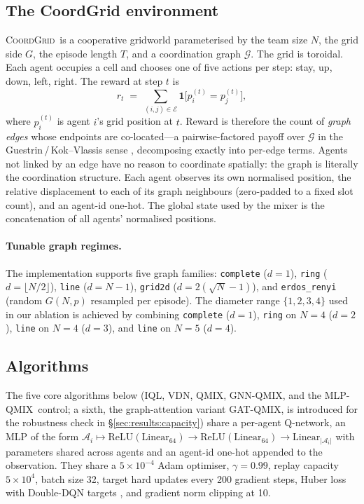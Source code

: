 \documentclass[10pt]{article}
\newcommand{\algoname}[1]{\textsc{#1}}
\newcommand{\iql}{\algoname{IQL}}
\newcommand{\vdn}{\algoname{VDN}}
\newcommand{\qmix}{\algoname{QMIX}}
\newcommand{\gnnqmix}{\algoname{GNN-QMIX}}
\newcommand{\coordgrid}{\textsc{CoordGrid}}
\newcommand{\Aagent}{\mathcal{A}}
\newcommand{\Egraph}{\mathcal{E}}
\newcommand{\Gtask}{\mathcal{G}}
\newcommand{\mlpqmix}{\algoname{MLP-QMIX}}
\newcommand{\gatqmix}{\algoname{GAT-QMIX}}
\begin{document}
\subsection{The CoordGrid environment}
\label{sec:env}

\coordgrid\ is a cooperative gridworld parameterised by the team size $N$,
the grid side $G$, the episode length $T$, and a coordination graph
$\Gtask$. The grid is toroidal. Each agent occupies a cell and chooses one
of five actions per step: stay, up, down, left, right. The reward at step
$t$ is
\[
  r_t \;=\; \sum_{(i,j) \in \Egraph} \mathbf{1}\bigl[p_i^{(t)} = p_j^{(t)}\bigr],
\]
where $p_i^{(t)}$ is agent $i$'s grid position at $t$. Reward is therefore
the count of \emph{graph edges} whose endpoints are co-located---a
pairwise-factored payoff over $\Gtask$ in the Guestrin\,/\,Kok--Vlassis sense
\citep{guestrin_2002_coordrl,kok_2004_sparseq}, decomposing exactly into
per-edge terms. Agents not
linked by an edge have no reason to coordinate spatially: the graph is
literally the coordination structure. Each agent observes its own
normalised position, the relative displacement to each of its graph
neighbours (zero-padded to a fixed slot count), and an agent-id one-hot.
The global state used by the mixer is the concatenation of all agents'
normalised positions.

\paragraph{Tunable graph regimes.} The implementation supports five graph
families: \texttt{complete} ($d=1$), \texttt{ring} ($d=\lfloor N/2 \rfloor$),
\texttt{line} ($d = N-1$), \texttt{grid2d} ($d = 2(\sqrt N - 1)$), and
\texttt{erdos\_renyi} (random $G(N, p)$ resampled per episode). The
diameter range $\{1, 2, 3, 4\}$ used in our ablation is achieved by
combining \texttt{complete} ($d=1$), \texttt{ring} on $N=4$ ($d=2$),
\texttt{line} on $N=4$ ($d=3$), and \texttt{line} on $N=5$ ($d=4$).

\subsection{Algorithms}
\label{sec:algos}

The five core algorithms below (\iql, \vdn, \qmix, \gnnqmix, and the
\mlpqmix\ control; a sixth, the graph-attention variant \gatqmix, is
introduced for the robustness check in \S\ref{sec:results:capacity})
share a per-agent Q-network, an MLP of the form
$\Aagent_i \mapsto \mathrm{ReLU}(\mathrm{Linear}_{64})
\rightarrow \mathrm{ReLU}(\mathrm{Linear}_{64})
\rightarrow \mathrm{Linear}_{|\Aagent_i|}$ with parameters shared across
agents and an agent-id one-hot appended to the observation. They share a
$5\times 10^{-4}$ Adam optimiser, $\gamma = 0.99$, replay capacity $5\times10^4$,
batch size 32, target hard updates every 200 gradient steps, Huber loss
with Double-DQN targets \citep{vanhasselt_2016_doubledqn}, and gradient norm
clipping at 10.
\end{document}
